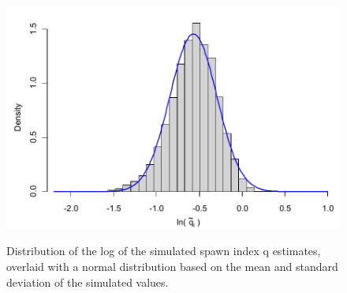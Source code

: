 \begin{figure}[!tbp]
	\centering
	\includegraphics[width=\textwidth]{../FIGS/qprior.pdf}\\
	\caption{Distribution of the log of the simulated spawn index q estimates, overlaid with a normal distribution based on the mean and standard deviation of the simulated values.}\label{AppendixC:fig1}
\end{figure}



